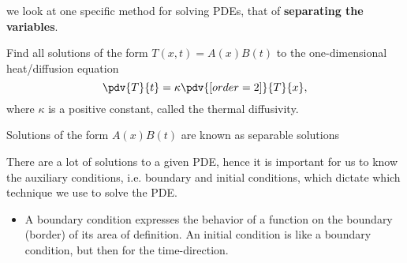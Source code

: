 we look at one specific method for solving PDEs, that of \textbf{separating the variables}.

\begin{exercise}
Find all solutions of the form $T(x,t)=A(x)B(t)$ to the one-dimensional heat/diffusion equation
\[ \pdv{T}{t}=\kappa\pdv{[order={2}]}{T}{x}, \]
where $\kappa$ is a positive constant, called the thermal diffusivity.
\end{exercise}

Solutions of the form $A(x)B(t)$ are known as separable solutions

There are a lot of solutions to a given PDE, hence it is important for us to know the auxiliary conditions, i.e. boundary and initial conditions, which dictate which technique we use to solve the PDE.
\begin{itemize}
\item A boundary condition expresses the behavior of a function on the boundary (border) of its area of definition. An initial condition is like a boundary condition, but then for the time-direction.
\end{itemize}
\pagebreak